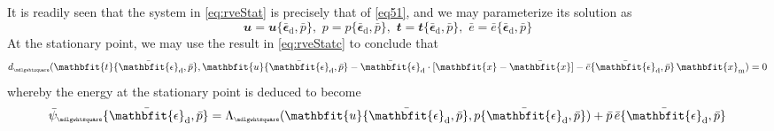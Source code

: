 \documentclass[12pt,a4paper]{article}
\renewcommand{\ta}[1]{\mathbfit{#1}}
\renewcommand{\ts}[1]{\mathbfit{#1}}
\renewcommand{\Box}{\mdlgwhtsquare}
\renewcommand{\dev}{\mathrm{d}}
\newcommand{\rve}{
  {\mathchoice
   {\mbox{\scalebox{0.67}{$\Box$}}}
   {\mbox{\scalebox{0.67}{$\Box$}}}
   {\mbox{\scalebox{0.5}{$\Box$}}}
   {\mbox{\scalebox{0.375}{$\Box$}}}
  }
}
\begin{document}
It is readily seen that the system in \cref{eq:rveStat} is precisely that of \cref{eq51}, and we may parameterize its solution as
\begin{equation}
    \ta{u}=\ta{u}\{\bar{\ts\epsilon}_\dev,\bar{p}\}, \,\,
    p=p\{\bar{\ts\epsilon}_\dev,\bar{p}\}, \,\,
    \ta{t}=\ta{t}\{\bar{\ts\epsilon}_\dev,\bar{p}\}, \,\,
    \bar{e}=\bar{e}\{\bar{\ts\epsilon}_\dev,\bar{p}\}
\label{eq85}
\end{equation}
At the stationary point, we may use the result in \cref{eq:rveStatc} to conclude that
\begin{equation}
    d_\rve(\ta{t}\{\bar{\ts\epsilon}_\dev,\bar{p}\},\ta{u}\{\bar{\ts\epsilon}_\dev,\bar{p}\}-\bar{\ts\epsilon}_\dev\cdot[\ta{x}-\bar{\ta{x}}]-\bar{e}\{\bar{\ts\epsilon}_\dev,\bar{p}\}\,\ta{x}_\mean) = 0
\label{eq86}
\end{equation}
whereby the energy at the stationary point is deduced to become
\begin{equation}
    \bar{\psi}_\rve\{\bar{\ts\epsilon}_\dev,\bar{p}\} =
    \Lambda_\rve(\ta{u}\{\bar{\ts\epsilon}_\dev,\bar{p}\},p\{\bar{\ts\epsilon}_\dev,\bar{p}\}) + \bar{p}\,\bar{e}\{\bar{\ts\epsilon}_\dev,\bar{p}\}
\label{eq87}
\end{equation}
\end{document}
